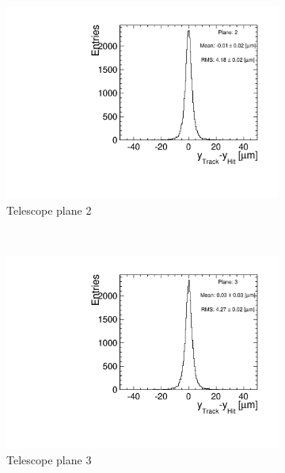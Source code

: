 \begin{figure}[htbp]
\begin{subfigure}[b]{0.3\textwidth}
    \includegraphics[width=\textwidth]{figures/Telescope/biasedResiduals/BiasedResiduals_run77_PlaneYRMS2.pdf}
    \caption{Telescope plane 2}
  \end{subfigure} \\
  \begin{subfigure}[b]{0.3\textwidth}
    \includegraphics[width=\textwidth]{figures/Telescope/biasedResiduals/BiasedResiduals_run77_PlaneYRMS3.pdf}
    \caption{Telescope plane 3}
  \end{subfigure}\hfill
  \begin{subfigure}[b]{0.3\textwidth}

\end{subfigure}
\end{figure}
